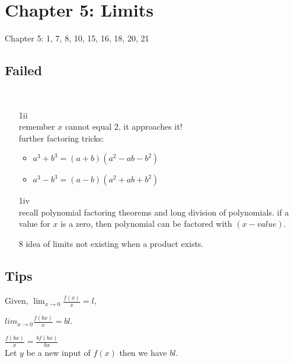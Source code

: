 \documentclass[a4paper, 12pt]{article}
\begin{document}
\maketitle
\section*{Chapter 5: Limits}
Chapter 5: 1, 7, 8, 10, 15, 16, 18, 20, 21\\




\subsection*{Failed} \\
\begin{enumerate}
    \item[ 1ii ] \\
    remember $x$ cannot equal $2$, it approaches it!\\
    further factoring tricks:\\
\begin{itemize}
    \item $a^3 + b^3 = (a + b) (a^2 -ab - b^2)$
    \item $a^3 - b^3 = (a -b)(a^2 +ab + b^2)$
\end{itemize}

    \item[1iv] \\
recall polynomial factoring theorems and long division of polynomials.
if a value for $x$ is a zero, then polynomial can be factored with $(x-value)$.

\item[8] idea of limits not existing when a product exists.
\end{enumerate}


\subsection*{Tips} 

Given, $\lim_{x \rightarrow 0} \frac{f(x)}{x} = l$, \\
\centerline{$lim_{x \rightarrow 0} \frac{f(bx)}{x} = bl.$}

\textcolor[gray]{0.5}{$\frac{f(bx)}{x} = \frac{bf(bx)}{bx}$\\
Let $y$ be a new input of $f(x)$ then we have $bl$.}
\end{document}

